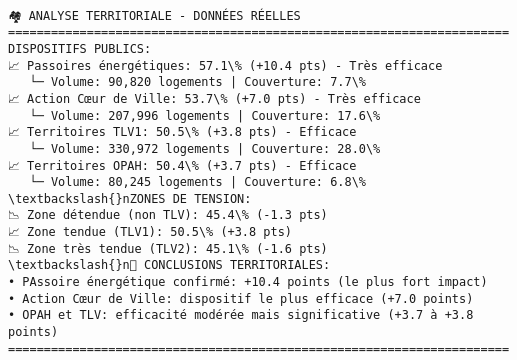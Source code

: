 \documentclass[11pt]{article}
\makeatletter
\newcommand{\boxspacing}{\kern\kvtcb@left@rule\kern\kvtcb@boxsep}
\newcommand{\prompt}[4]{
        {\ttfamily\llap{{\color{#2}[#3]:\hspace{3pt}#4}}\vspace{-\baselineskip}}
    }
\makeatother
\begin{document}
    \begin{center}
    \end{center}
    { \hspace*{\fill} \\}
    
    \begin{Verbatim}[commandchars=\\\{\}]
🏘️ ANALYSE TERRITORIALE - DONNÉES RÉELLES
======================================================================
DISPOSITIFS PUBLICS:
📈 Passoires énergétiques: 57.1\% (+10.4 pts) - Très efficace
   └─ Volume: 90,820 logements | Couverture: 7.7\%
📈 Action Cœur de Ville: 53.7\% (+7.0 pts) - Très efficace
   └─ Volume: 207,996 logements | Couverture: 17.6\%
📈 Territoires TLV1: 50.5\% (+3.8 pts) - Efficace
   └─ Volume: 330,972 logements | Couverture: 28.0\%
📈 Territoires OPAH: 50.4\% (+3.7 pts) - Efficace
   └─ Volume: 80,245 logements | Couverture: 6.8\%
\textbackslash{}nZONES DE TENSION:
📉 Zone détendue (non TLV): 45.4\% (-1.3 pts)
📈 Zone tendue (TLV1): 50.5\% (+3.8 pts)
📉 Zone très tendue (TLV2): 45.1\% (-1.6 pts)
\textbackslash{}n🎯 CONCLUSIONS TERRITORIALES:
• PAssoire énergétique confirmé: +10.4 points (le plus fort impact)
• Action Cœur de Ville: dispositif le plus efficace (+7.0 points)
• OPAH et TLV: efficacité modérée mais significative (+3.7 à +3.8 points)
======================================================================
    \end{Verbatim}

    \begin{tcolorbox}[breakable, size=fbox, boxrule=1pt, pad at break*=1mm,colback=cellbackground, colframe=cellborder]
\prompt{In}{incolor}{ }{\boxspacing}
\begin{Verbatim}[commandchars=\\\{\}]

\end{Verbatim}
\end{tcolorbox}

    \begin{tcolorbox}[breakable, size=fbox, boxrule=1pt, pad at break*=1mm,colback=cellbackground, colframe=cellborder]
\prompt{In}{incolor}{ }{\boxspacing}
\begin{Verbatim}[commandchars=\\\{\}]

\end{Verbatim}
\end{tcolorbox}
\end{document}
